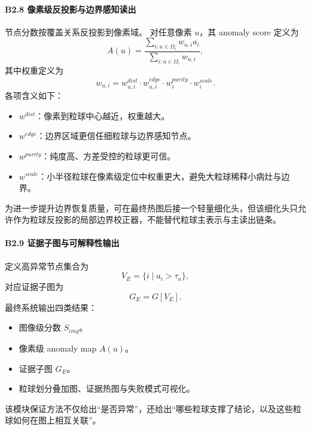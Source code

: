 \documentclass[UTF8,a4paper]{ctexart}
\begin{document}
\paragraph{B2.8 像素级反投影与边界感知读出}
节点分数按覆盖关系反投影到像素域。
对任意像素 $u$，其 anomaly score 定义为
\begin{equation}
  A(u)=
  \frac{\sum_{i:u\in\Omega_i}w_{u,i}a_i}
       {\sum_{i:u\in\Omega_i}w_{u,i}},
\end{equation}
其中权重定义为
\begin{equation}
  w_{u,i}=w_{u,i}^{dist}\cdot w_{u,i}^{edge}\cdot w_i^{purity}\cdot w_i^{scale}.
\end{equation}
各项含义如下：
\begin{itemize}
  \item $w^{dist}$：像素到粒球中心越近，权重越大。
  \item $w^{edge}$：边界区域更信任细粒球与边界感知节点。
  \item $w^{purity}$：纯度高、方差受控的粒球更可信。
  \item $w^{scale}$：小半径粒球在像素级定位中权重更大，避免大粒球稀释小病灶与边界。
\end{itemize}
为进一步提升边界恢复质量，可在最终热图后接一个轻量细化头，但该细化头只允许作为粒球反投影的局部边界校正器，不能替代粒球主表示与主读出链条。

\paragraph{B2.9 证据子图与可解释性输出}
定义高异常节点集合为
\begin{equation}
  V_E=\{i\mid a_i>\tau_a\},
\end{equation}
对应证据子图为
\begin{equation}
  G_E=G[V_E].
\end{equation}
最终系统输出四类结果：
\begin{itemize}
  \item 图像级分数 $S_{img}$。
  \item 像素级 anomaly map $A(u)$。
  \item 证据子图 $G_E$。
  \item 粒球划分叠加图、证据热图与失败模式可视化。
\end{itemize}
该模块保证方法不仅给出“是否异常”，还给出“哪些粒球支撑了结论，以及这些粒球如何在图上相互关联”。
\end{document}
